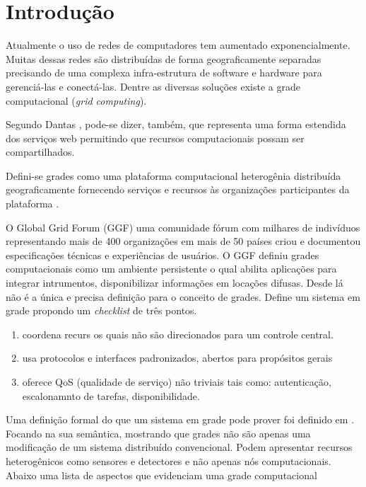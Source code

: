 \section*{Introdução}
\label{cap:introducao}

Atualmente o uso de redes de computadores tem aumentado exponencialmente. Muitas dessas redes são distribuídas de forma geograficamente separadas precisando de uma complexa infra-estrutura de software e hardware para gerenciá-las e conectá-las. Dentre as diversas soluções existe a grade computacional (\emph{grid computing}).

Segundo Dantas \cite{Mangan2006}, pode-se dizer, também, que representa uma forma estendida dos serviços web permitindo que recursos computacionais possam ser compartilhados.

Defini-se grades como uma plataforma computacional heterogênia distribuída geograficamente fornecendo serviços e recursos às organizações participantes da plataforma \cite{Mangan2006}.

\cite[apud]{Mangan2006} O Global Grid Forum (GGF) uma comunidade fórum com milhares de indivíduos representando mais de 400 organizações em mais de 50 países criou e documentou especificações técnicas e experiências de usuários. O GGF definiu grades computacionais como um ambiente persistente o qual abilita aplicações para integrar intrumentos, disponibilizar informações em locações difusas. Desde lá não é a única e precisa definição para o conceito de grades. \cite{Kesselman2001} Define um sistema em grade propondo um \emph{checklist} de três pontos.

\begin{enumerate}
\item
coordena recurs os quais não são direcionados para um controle central.
\item
usa protocolos e interfaces padronizados, abertos para propósitos gerais
\item
oferece QoS (qualidade de serviço) não triviais tais como: autenticação, escalonamnto de tarefas, disponibilidade.
\end{enumerate}

Uma definição formal do que um sistema em grade pode prover foi definido em \cite{Mangan2006}. Focando na sua semântica, mostrando que grades não são apenas uma modificação de um sistema distribuído convencional. Podem apresentar recursos heterogênicos como sensores e detectores e não apenas nós computacionais. Abaixo uma lista de aspectos que evidenciam uma grade computacional \cite{Cirne2002}
